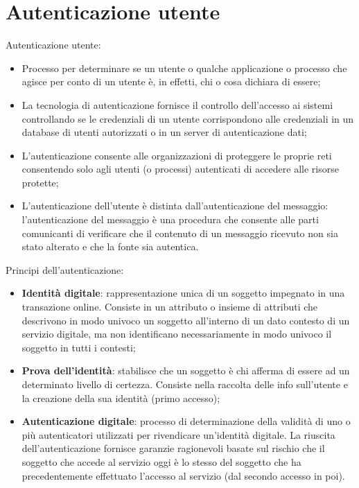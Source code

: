 \setchapterpreamble[u]{\margintoc}
\chapter{Autenticazione utente}

Autenticazione utente:
\begin{itemize}
    \item Processo per determinare se un utente o qualche applicazione o processo che agisce per conto di un utente è, in effetti, chi o cosa dichiara di essere;
	\item La tecnologia di autenticazione fornisce il controllo dell'accesso ai sistemi controllando se le credenziali di un utente corrispondono alle credenziali in un database di utenti autorizzati o in un server di autenticazione dati;
	\item L'autenticazione consente alle organizzazioni di proteggere le proprie reti consentendo solo agli utenti (o processi) autenticati di accedere alle risorse protette;
	\item L'autenticazione dell'utente è distinta dall'autenticazione del messaggio: l'autenticazione del messaggio è una procedura che consente alle parti comunicanti di verificare che il contenuto di un messaggio ricevuto non sia stato alterato e che la fonte sia autentica.
\end{itemize}

Principi dell'autenticazione:
\begin{itemize}
    \item \textbf{Identità digitale}: rappresentazione unica di un soggetto impegnato in una transazione online. Consiste in un attributo o insieme di attributi che descrivono in modo univoco un soggetto all'interno di un dato contesto di un servizio digitale, ma non identificano necessariamente in modo univoco il soggetto in tutti i contesti;
	\item \textbf{Prova dell'identità}: stabilisce che un soggetto è chi afferma di essere ad un determinato livello di certezza. Consiste nella raccolta delle info sull'utente e la creazione della sua identità (primo accesso);
	\item \textbf{Autenticazione digitale}: processo di determinazione della validità di uno o più autenticatori utilizzati per rivendicare un'identità digitale. La riuscita dell'autenticazione fornisce garanzie ragionevoli basate sul rischio che il soggetto che accede al servizio oggi è lo stesso del soggetto che ha precedentemente effettuato l'accesso al servizio (dal secondo accesso in poi).
\end{itemize}

